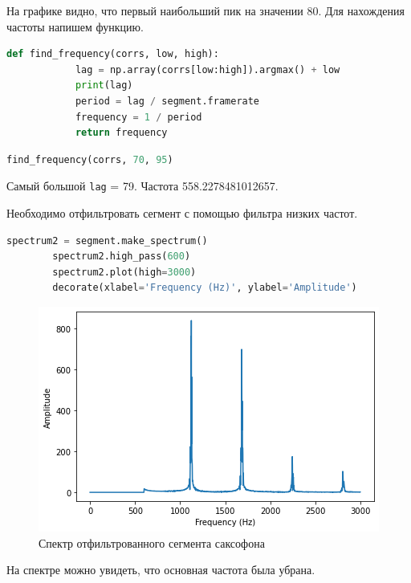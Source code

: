 \documentclass[a4paper, 14pt]{extarticle}
\begin{document}
    На графике видно, что первый наибольший пик на значении 80.
    Для нахождения частоты напишем функцию.

    \begin{lstlisting}[language=Python, caption= Функция find\_frequency, label={lst:find_frequency}]
        def find_frequency(corrs, low, high):
            lag = np.array(corrs[low:high]).argmax() + low
            print(lag)
            period = lag / segment.framerate
            frequency = 1 / period
            return frequency
    \end{lstlisting}

    \begin{lstlisting}[language=Python, caption= Вызов find\_frquency, label={lst:call_find_frequency}]
        find_frequency(corrs, 70, 95)
    \end{lstlisting}

    Самый большой \texttt{lag} = 79.
    Частота 558.2278481012657.

    Необходимо отфильтровать сегмент с помощью фильтра низких частот.

    \begin{lstlisting}[language=Python, caption= Фильтрация сегмента, label={lst:high_pass}]
        spectrum2 = segment.make_spectrum()
        spectrum2.high_pass(600)
        spectrum2.plot(high=3000)
        decorate(xlabel='Frequency (Hz)', ylabel='Amplitude')
    \end{lstlisting}

    \begin{figure}[H]
        \centering
        \includegraphics[width=0.8\linewidth]{sax_filtered_spectrum}
        \caption{Спектр отфильтрованного сегмента саксофона}
        \label{fig:sax_filtered_spectrum}
    \end{figure}

    На спектре можно увидеть, что основная частота была убрана.
\end{document}
